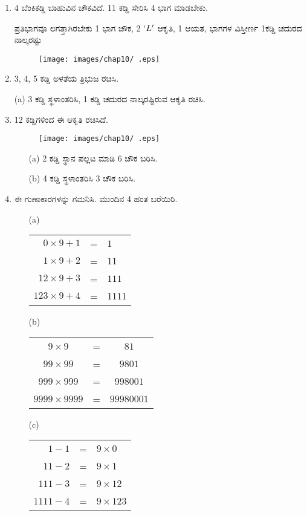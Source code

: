 \begin{enumerate}
\item 4 ಬೆಂಕಿಕಡ್ಡಿ ಬಾಹುವಿನ ಚೌಕವಿದೆ. 11 ಕಡ್ಡಿ ಸೇರಿಸಿ 4 ಭಾಗ ಮಾಡಬೇಕು. 

ಪ್ರತಿಭಾಗವೂ ಲಗತ್ತಾಗಿರಬೇಕು 1 ಭಾಗ ಚೌಕ, 2 $`L'$ ಆಕೃತಿ, 1 ಆಯತ, ಭಾಗಗಳ ವಿಸ್ತೀರ್ಣ 1ಕಡ್ಡಿ ಚದುರದ ನಾಲ್ಕರಷ್ಟು 

\begin{figure}[!h]
\centering
\texttt{[image: images/chap10/ .eps]}
\end{figure}

\item 3, 4, 5 ಕಡ್ಡಿ ಅಳತೆಯ ತ್ರಿಭುಜ ರಚಿಸಿ. 

(a) 3 ಕಡ್ಡಿ ಸ್ಥಳಾಂತರಿಸಿ, 1  ಕಡ್ಡಿ ಚದುರದ ನಾಲ್ಕರಷ್ಟಿರುವ ಆಕೃತಿ ರಚಿಸಿ. 

\item 12 ಕಡ್ಡಿಗಳಿಂದ ಈ ಆಕೃತಿ ರಚಿಸಿದೆ. 
\begin{figure}[!h]
\centering
\texttt{[image: images/chap10/ .eps]}
\end{figure}
\begin{itemize}
\item[(a)] 2 ಕಡ್ಡಿ ಸ್ಥಾನ ಪಲ್ಲಟ ಮಾಡಿ 6 ಚೌಕ ಬರಿಸಿ. 
\item[(b)] 4 ಕಡ್ಡಿ ಸ್ಥಳಾಂತರಿಸಿ 3 ಚೌಕ ಬರಿಸಿ. 
\end{itemize}

\item ಈ ಗುಣಾಕಾರಗಳನ್ನು ಗಮನಿಸಿ. ಮುಂದಿನ 4 ಹಂತ ಬರೆಯಿರಿ. 
\begin{itemize}
\item[(a)]
\begin{tabular}[t]{rcl}
$0\times 9 + 1$ & = & $1$\\
$1\times 9 + 2$ & = & $11$\\
$12\times 9 + 3$ & = & $111$\\
$123\times 9 + 4$ & = & $1111$
\end{tabular}
\item[(b)]
\begin{tabular}[t]{ccc}
$9\times 9$ & = & $81$\\
$99\times 99$ & = & $9801$\\
$999\times 999$ & = & $998001$\\
$9999\times 9999$ & = & $99980001$
\end{tabular}
\item[(c)]
\begin{tabular}[t]{rcl}
$1 - 1$ & = & $9\times 0$\\
$11 - 2$ & = & $9\times 1$\\
$111 - 3$ & = & $9\times 12$\\
$1111 - 4$ & = & $9\times 123$
\end{tabular}
\end{itemize}


\end{enumerate}
